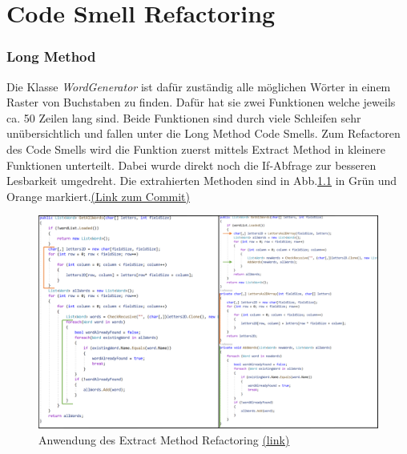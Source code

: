 \chapter{Code Smell Refactoring}

\subsection{Long Method}

Die Klasse \textit{WordGenerator} ist dafür zuständig alle möglichen Wörter in einem Raster von Buchstaben zu finden. Dafür hat sie zwei Funktionen welche jeweils ca. 50 Zeilen lang sind. Beide Funktionen sind durch viele Schleifen sehr unübersichtlich und fallen unter die Long Method Code Smells. Zum Refactoren des Code Smells wird die Funktion zuerst mittels Extract Method in kleinere Funktionen unterteilt. Dabei wurde direkt noch die If-Abfrage zur besseren Lesbarkeit umgedreht. Die extrahierten Methoden sind in Abb.\ref{Abb:ExtractMethod} in Grün und Orange markiert.\href{https://github.com/EinToni/Wortfinder/commit/b6e3b31e4ef7b597863bc2be073f9e136d4b9594}{(Link zum Commit)}

\begin{figure}[!ht]
  \centering
  \includegraphics[width=\textwidth]{Bilder/ExtractMethod.PNG}
  \caption[Anwendung des Extract Method Refactoring]{Anwendung des Extract Method Refactoring \href{https://github.com/EinToni/WortfinderDoku/blob/main/Bilder/ExtractMethod.png}{(link)}}
  \label{Abb:ExtractMethod}
\end{figure}

